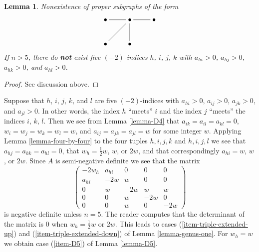 \documentclass{stacks-project}
\theoremstyle{plain}
\newtheorem{lemma}[subsection]{Lemma}
\theoremstyle{definition}
\theoremstyle{remark}
\numberwithin{equation}{subsection}
\begin{document}
\begin{lemma}
\label{lemma-fourfold}
Nonexistence of proper subgraphs of the form
$$
\xymatrix{
\bullet \ar@{-}[r] & \bullet \ar@{-}[ld] \ar@{-}[r] \ar@{-}[d] & \bullet \\
\bullet & \bullet
}
$$
If $n > 5$, there do {\bf not} exist five $(-2)$-indices
$h$, $i$, $j$, $k$ with $a_{hi} > 0$, $a_{hj} > 0$, $a_{hk} > 0$, and
$a_{hl} > 0$.
\end{lemma}

\begin{proof}
See discussion above.
\end{proof}

\noindent
Suppose that $h$, $i$, $j$, $k$, and $l$ are five $(-2)$-indices
with $a_{hi} > 0$, $a_{ij} > 0$, $a_{jk} > 0$, and $a_{jl} > 0$.
In other words, the index $h$ ``meets'' $i$ and the index $j$ ``meets''
the indices $i$, $k$, $l$. Then we see from
Lemma \ref{lemma-D4} that $a_{ik} = a_{il} = a_{kl} = 0$,
$w_i = w_j = w_k = w_l = w$, and $a_{ij} = a_{jk} = a_{jl} = w$
for some integer $w$. Applying Lemma \ref{lemma-four-by-four} to
the four tuples
$h, i, j, k$ and $h, i, j, l$ we see that $a_{hj} = a_{hk} = a_{hl} = 0$,
that $w_h = \frac{1}{2}w$, $w$, or $2w$, and that
correspondingly $a_{hi} = w$, $w$, or $2w$.
Since $A$ is semi-negative definite we see that the matrix
$$
\left(
\begin{matrix}
-2w_h & a_{hi} & 0 & 0 & 0 \\
a_{hi} & -2w & w & 0 & 0 \\
0 & w & -2w & w & w \\
0 & 0 & w & -2w & 0 \\
0 & 0 & w & 0 & -2w
\end{matrix}
\right)
$$
is negative definite unless $n = 5$. The reader computes that the
determinant of the matrix is $0$ when $w_h = \frac{1}{2}w$ or $2w$.
This leads to cases (\ref{item-triple-extended-up}) and
(\ref{item-triple-extended-down}) of Lemma \ref{lemma-genus-one}.
For $w_h = w$ we obtain case (\ref{item-D5}) of
Lemma \ref{lemma-D5}.
\end{document}
